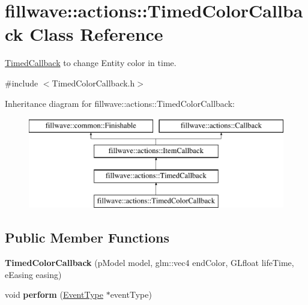 \hypertarget{classfillwave_1_1actions_1_1TimedColorCallback}{}\section{fillwave\+:\+:actions\+:\+:Timed\+Color\+Callback Class Reference}
\label{classfillwave_1_1actions_1_1TimedColorCallback}


\hyperlink{classfillwave_1_1actions_1_1TimedCallback}{Timed\+Callback} to change Entity color in time.  




{\ttfamily \#include $<$Timed\+Color\+Callback.\+h$>$}

Inheritance diagram for fillwave\+:\+:actions\+:\+:Timed\+Color\+Callback\+:\begin{figure}[H]
\begin{center}
\leavevmode
\includegraphics[height=4.000000cm]{classfillwave_1_1actions_1_1TimedColorCallback}
\end{center}
\end{figure}
\subsection*{Public Member Functions}
\begin{DoxyCompactItemize}
\item 
\hypertarget{classfillwave_1_1actions_1_1TimedColorCallback_acda27aa28af5947115074fe4f85812ba}{}{\bfseries Timed\+Color\+Callback} (p\+Model model, glm\+::vec4 end\+Color, G\+Lfloat life\+Time, e\+Easing easing)\label{classfillwave_1_1actions_1_1TimedColorCallback_acda27aa28af5947115074fe4f85812ba}

\item 
\hypertarget{classfillwave_1_1actions_1_1TimedColorCallback_a9a0cbff3e877d35b2db49143b75fcb87}{}void {\bfseries perform} (\hyperlink{classfillwave_1_1actions_1_1EventType}{Event\+Type} $\ast$event\+Type)\label{classfillwave_1_1actions_1_1TimedColorCallback_a9a0cbff3e877d35b2db49143b75fcb87}

\end{DoxyCompactItemize}
